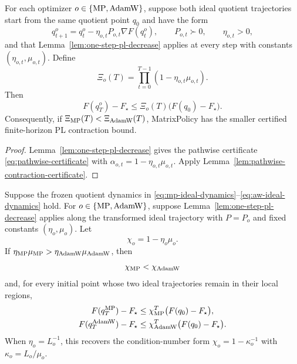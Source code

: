 \begin{proposition}
\label{prop:time-varying-pl-bound}
For each optimizer $o\in\{\operatorname{MP},\operatorname{AdamW}\}$, suppose both ideal quotient trajectories start
from the same quotient point $q_0$ and have the form
\begin{equation}
    q_{t+1}^o=q_t^o-\eta_{o,t}P_{o,t}\nabla F(q_t^o),
    \qquad P_{o,t}\succ0,
    \qquad \eta_{o,t}>0,
    \label{eq:time-varying-quotient-update}
\end{equation}
and that Lemma~\ref{lem:one-step-pl-decrease} applies at every step with constants
$(\eta_{o,t},\mu_{o,t})$.  Define
\begin{equation}
    \Xi_o(T)=\prod_{t=0}^{T-1}\left(1-\eta_{o,t}\mu_{o,t}\right).
    \label{eq:time-varying-product}
\end{equation}
Then
\begin{equation}
    F(q_T^o)-F_\star
    \leq
    \Xi_o(T)\bigl(F(q_0)-F_\star\bigr).
    \label{eq:time-varying-pl-bound}
\end{equation}
Consequently, if $\Xi_{\operatorname{MP}}(T)<\Xi_{\operatorname{AdamW}}(T)$, MatrixPolicy has the smaller certified
finite-horizon PL contraction bound.
\end{proposition}

\begin{proof}
Lemma~\ref{lem:one-step-pl-decrease} gives the pathwise certificate
\eqref{eq:pathwise-certificate} with $\alpha_{o,t}=1-\eta_{o,t}\mu_{o,t}$.  Apply
Lemma~\ref{lem:pathwise-contraction-certificate}.
\end{proof}

\begin{corollary}
\label{cor:frozen-pl-bound}
Suppose the frozen quotient dynamics in \eqref{eq:mp-ideal-dynamics}--\eqref{eq:aw-ideal-dynamics} hold.
For $o\in\{\operatorname{MP},\operatorname{AdamW}\}$, suppose Lemma~\ref{lem:one-step-pl-decrease} applies along
the transformed ideal trajectory with $P=P_o$ and fixed constants $(\eta_o,\mu_o)$.  Let
\begin{equation}
    \chi_o=1-\eta_o\mu_o.
\end{equation}
If $\eta_{\operatorname{MP}}\mu_{\operatorname{MP}}>\eta_{\operatorname{AdamW}}\mu_{\operatorname{AdamW}}$, then
\begin{equation}
    \chi_{\operatorname{MP}}<\chi_{\operatorname{AdamW}}
\end{equation}
and, for every initial point whose two ideal trajectories remain in their local regions,
\begin{align}
    F(q_T^{\operatorname{MP}})-F_\star
    &\leq \chi_{\operatorname{MP}}^T\bigl(F(q_0)-F_\star\bigr), \\
    F(q_T^{\operatorname{AdamW}})-F_\star
    &\leq \chi_{\operatorname{AdamW}}^T\bigl(F(q_0)-F_\star\bigr).
\end{align}
When $\eta_o=L_o^{-1}$, this recovers the condition-number form
$\chi_o=1-\kappa_o^{-1}$ with $\kappa_o=L_o/\mu_o$.
\end{corollary}

